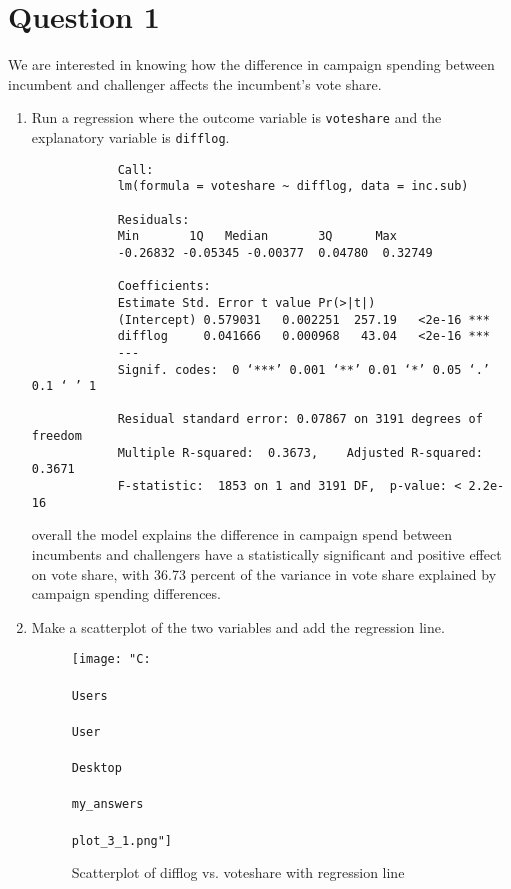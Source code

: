 \documentclass[12pt,letterpaper]{article}
\begin{document}
\section*{Question 1}
\vspace{.25cm}
\noindent We are interested in knowing how the difference in campaign spending between incumbent and challenger affects the incumbent's vote share. 
	\begin{enumerate}
		\item Run a regression where the outcome variable is \texttt{voteshare} and the explanatory variable is \texttt{difflog}.	\vspace{5cm}
		
		\vspace{0.2cm}
		\begin{verbatim}
			Call:
			lm(formula = voteshare ~ difflog, data = inc.sub)
			
			Residuals:
			Min       1Q   Median       3Q      Max 
			-0.26832 -0.05345 -0.00377  0.04780  0.32749 
			
			Coefficients:
			Estimate Std. Error t value Pr(>|t|)    
			(Intercept) 0.579031   0.002251  257.19   <2e-16 ***
			difflog     0.041666   0.000968   43.04   <2e-16 ***
			---
			Signif. codes:  0 ‘***’ 0.001 ‘**’ 0.01 ‘*’ 0.05 ‘.’ 0.1 ‘ ’ 1
			
			Residual standard error: 0.07867 on 3191 degrees of freedom
			Multiple R-squared:  0.3673,	Adjusted R-squared:  0.3671 
			F-statistic:  1853 on 1 and 3191 DF,  p-value: < 2.2e-16
		\end{verbatim}
		overall the model explains the difference in campaign spend between incumbents and challengers have a statistically significant and positive effect on vote share, with 36.73 percent of the variance in vote share explained by campaign spending differences.
		\vspace{.25cm}
		\item Make a scatterplot of the two variables and add the regression line. 	\vspace{0.7cm}
		
		\vspace{7.1cm}
			\begin{figure}[h!]
			\centering
			\texttt{[image: "C:\\\\Users\\\\User\\\\Desktop\\\\my\_answers\\\\plot\_3\_1.png"]}
			\caption{Scatterplot of difflog vs. voteshare with regression line}
			\label{fig:plot_1}
		\end{figure}
		

\end{enumerate}
\end{document}
